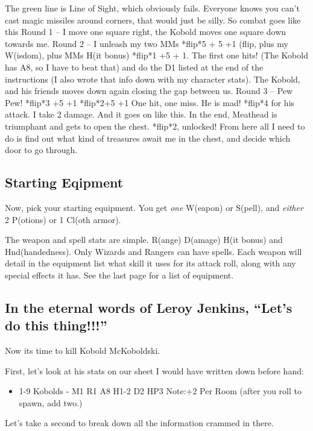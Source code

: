 \documentclass[a6paper,hidelinks]{article}
\begin{document}
The green line is Line of Sight, which obviously fails. Everyone
knows you can’t cast magic missiles around corners, that
would just be silly.
So combat goes like this
Round 1 – I move one square right, the Kobold moves one
square down towards me.
Round 2 – I unleash my two MMs *flip*5 + 5 +1 (flip, plus my
W(isdom), plus MMs H(it bonus) *flip*1 +5 + 1. The first one
hits! (The Kobold has A8, so I have to beat that) and do the D1
listed at the end of the instructions (I also wrote that info
down with my character stats). The Kobold, and his friends
moves down again closing the gap between us.
Round 3 – Pew Pew! *flip*3 +5 +1 *flip*2+5 +1 One hit, one
miss. He is mad! *flip*4 for his attack. I take 2 damage.
And it goes on like this. In the end, Meathead is triumphant
and gets to open the chest. *flip*2, unlocked! From here all I
need to do is find out what kind of treasures await me in the
chest, and decide which door to go through.

\subsection{Starting Eqipment}
Now, pick your starting equipment. You get {\em one} W(eapon) or S(pell), and {\em either} 2 P(otions) or 1 Cl(oth armor).

The weapon and spell stats are simple. R(ange) D(amage) H(it bonus) and Hnd(handedness). Only Wizards and Rangers can have spells. Each weapon will detail in the equipment list what skill it uses for its attack roll, along with any special effects it has. See the last page for a list of equipment.

\subsection{In the eternal words of Leroy Jenkins, ``Let's do this thing!!!''}

Now its time to kill Kobold McKoboldski.

First, let’s look at his stats on our sheet I would have written down before hand:
\begin{itemize}
\item 1-9 Kobolds - M1 R1 A8 H1-2 D2 HP3 Note:+2 Per Room (after you roll to spawn, add two.)
\end{itemize}

Let's take a second to break down all the information crammed in there.
\end{document}
